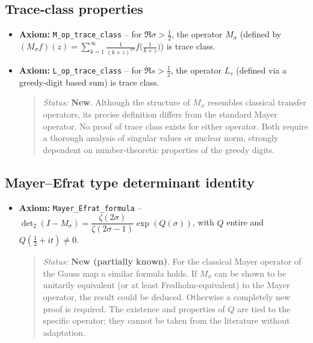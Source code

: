 \documentclass{article}
\begin{document}
\subsection{Trace‑class properties}
\begin{itemize}
  \item \textbf{Axiom:} \texttt{M\_op\_trace\_class} – for $\Re\sigma>\frac12$, the operator $M_\sigma$ (defined by 
  \( (M_\sigma f)(z)=\sum_{k=1}^\infty \frac{1}{(k+z)^{2\sigma}} f\bigl(\frac1{k+z}\bigr) \)) is trace class.
  \item \textbf{Axiom:} \texttt{L\_op\_trace\_class} – for $\Re s>\frac12$, the operator $L_s$ (defined via a greedy‑digit based sum) is trace class.
  \begin{quote}
    \emph{Status:} \textbf{New}.  Although the structure of $M_\sigma$ resembles classical transfer operators, its precise definition differs from the standard Mayer operator.  No proof of trace class exists for either operator.  Both require a thorough analysis of singular values or nuclear norm, strongly dependent on number‑theoretic properties of the greedy digits.
  \end{quote}
\end{itemize}

\subsection{Mayer–Efrat type determinant identity}
\begin{itemize}
  \item \textbf{Axiom:} \texttt{Mayer\_Efrat\_formula} – 
  \(\det_2(I - M_\sigma) = \dfrac{\zeta(2\sigma)}{\zeta(2\sigma-1)} \exp(Q(\sigma))\), with $Q$ entire and $Q(\frac12+it)\neq0$.
  \begin{quote}
    \emph{Status:} \textbf{New (partially known)}.  For the classical Mayer operator of the Gauss map a similar formula holds.  If $M_\sigma$ can be shown to be unitarily equivalent (or at least Fredholm‑equivalent) to the Mayer operator, the result could be deduced.  Otherwise a completely new proof is required.  The existence and properties of $Q$ are tied to the specific operator; they cannot be taken from the literature without adaptation.
  \end{quote}
\end{itemize}
\end{document}
